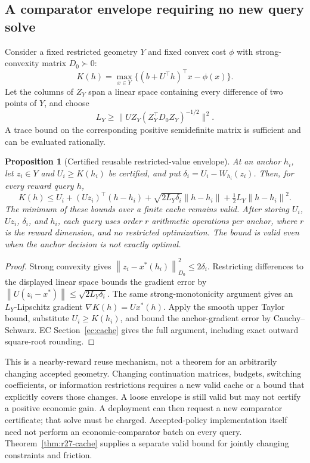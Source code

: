 \documentclass[11pt,letterpaper]{article}
\newtheorem{proposition}[theorem]{Proposition}
\theoremstyle{definition}\newtheorem{assumption}[theorem]{Assumption}
\newcommand{\norm}[1]{\left\lVert#1\right\rVert}
\begin{document}
\subsection{A comparator envelope requiring no new query solve}
Consider a fixed restricted geometry $Y$ and fixed convex cost $\phi$ with strong-convexity matrix $D_0\succ0$:
\[
 K(h)=\max_{x\in Y}\{(b+U^\top h)^\top x-\phi(x)\}.
\]
Let the columns of $Z_Y$ span a linear space containing every difference of two points of $Y$, and choose
\[
 L_Y\geq\bigl\|UZ_Y(Z_Y^\top D_0Z_Y)^{-1/2}\bigr\|^2.
\]
A trace bound on the corresponding positive semidefinite matrix is sufficient and can be evaluated rationally.
\begin{proposition}[Certified reusable restricted-value envelope]\label{prop:cache}
At an anchor $h_i$, let $z_i\in Y$ and $U_i\geq K(h_i)$ be certified, and put $\delta_i=U_i-W_{h_i}(z_i)$. Then, for every reward query $h$,
\begin{equation}\label{eq:cache}
 K(h)\leq U_i+(Uz_i)^\top(h-h_i)
 +\sqrt{2L_Y\delta_i}\norm{h-h_i}
 +\tfrac12L_Y\norm{h-h_i}^2.
\end{equation}
The minimum of these bounds over a finite cache remains valid. After storing $U_i$, $Uz_i$, $\delta_i$, and $h_i$, each query uses order $r$ arithmetic operations per anchor, where $r$ is the reward dimension, and no restricted optimization. The bound is valid even when the anchor decision is not exactly optimal.
\end{proposition}
\begin{proof}
Strong convexity gives $\norm{z_i-x^*(h_i)}_{D_0}^2\leq2\delta_i$. Restricting differences to the displayed linear space bounds the gradient error by $\norm{U(z_i-x^*)}\leq\sqrt{2L_Y\delta_i}$. The same strong-monotonicity argument gives an $L_Y$-Lipschitz gradient $\nabla K(h)=Ux^*(h)$. Apply the smooth upper Taylor bound, substitute $U_i\geq K(h_i)$, and bound the anchor-gradient error by Cauchy--Schwarz. EC Section~\ref{ec:cache} gives the full argument, including exact outward square-root rounding.\end{proof}

This is a nearby-reward reuse mechanism, not a theorem for an arbitrarily changing accepted geometry. Changing continuation matrices, budgets, switching coefficients, or information restrictions requires a new valid cache or a bound that explicitly covers those changes. A loose envelope is still valid but may not certify a positive economic gain. A deployment can then request a new comparator certificate; that solve must be charged. Accepted-policy implementation itself need not perform an economic-comparator batch on every query. Theorem~\ref{thm:r27-cache} supplies a separate valid bound for jointly changing constraints and friction.
\end{document}
